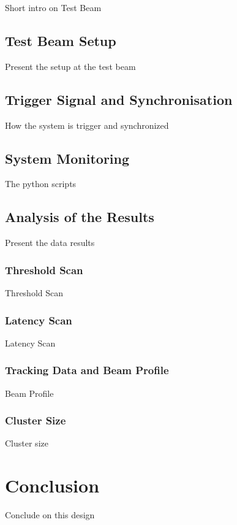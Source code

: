        Short intro on Test Beam

        \subsection{Test Beam Setup}

            Present the setup at the test beam

        \subsection{Trigger Signal and Synchronisation}

            How the system is trigger and synchronized

        \subsection{System Monitoring}

            The python scripts

        \subsection{Analysis of the Results}

            Present the data results

            \subsubsection{Threshold Scan}

                Threshold Scan

            \subsubsection{Latency Scan}

                Latency Scan

            \subsubsection{Tracking Data and Beam Profile}

                Beam Profile

            \subsubsection{Cluster Size}

                Cluster size

    \section{Conclusion}

        Conclude on this design


